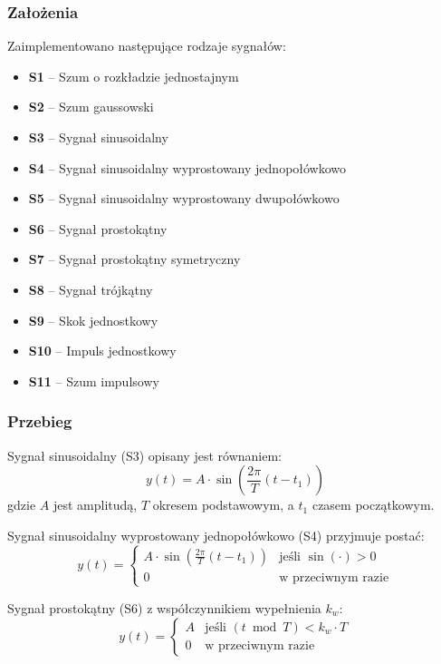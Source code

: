 \documentclass[12pt]{article}
\begin{document}
\subsubsection{Założenia}

Zaimplementowano następujące rodzaje sygnałów:

\begin{itemize}
  \item \textbf{S1} -- Szum o rozkładzie jednostajnym
  \item \textbf{S2} -- Szum gaussowski
  \item \textbf{S3} -- Sygnał sinusoidalny
  \item \textbf{S4} -- Sygnał sinusoidalny wyprostowany jednopołówkowo
  \item \textbf{S5} -- Sygnał sinusoidalny wyprostowany dwupołówkowo
  \item \textbf{S6} -- Sygnał prostokątny
  \item \textbf{S7} -- Sygnał prostokątny symetryczny
  \item \textbf{S8} -- Sygnał trójkątny
  \item \textbf{S9} -- Skok jednostkowy
  \item \textbf{S10} -- Impuls jednostkowy
  \item \textbf{S11} -- Szum impulsowy
\end{itemize}

\subsubsection{Przebieg}

Sygnał sinusoidalny (S3) opisany jest równaniem:
\begin{equation}
  y(t) = A \cdot \sin\!\left(\frac{2\pi}{T}(t - t_1)\right)
  \label{eq:sine}
\end{equation}
gdzie $A$ jest amplitudą, $T$ okresem podstawowym, a $t_1$ czasem
początkowym.

Sygnał sinusoidalny wyprostowany jednopołówkowo (S4) przyjmuje
postać:
\begin{equation}
  y(t) = \begin{cases} A \cdot \sin\!\left(\frac{2\pi}{T}(t - t_1)\right) &
  \text{jeśli } \sin(\cdot) > 0 \\ 0 & \text{w przeciwnym razie}
  \end{cases}
  \label{eq:sine_half}
\end{equation}

Sygnał prostokątny (S6) z współczynnikiem wypełnienia $k_w$:
\begin{equation}
  y(t) = \begin{cases} A & \text{jeśli } (t \bmod T) < k_w \cdot T \\
  0 & \text{w przeciwnym razie} \end{cases}
  \label{eq:square}
\end{equation}
\end{document}
